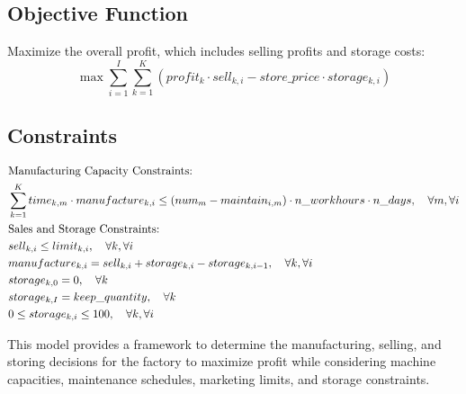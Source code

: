 \documentclass{article}
\begin{document}
\subsection*{Objective Function}
Maximize the overall profit, which includes selling profits and storage costs:
\[
\max \sum_{i=1}^{I} \sum_{k=1}^{K} \left( profit_{k} \cdot sell_{k,i} - store\_price \cdot storage_{k,i} \right)
\]

\subsection*{Constraints}
\begin{align}
    & \text{Manufacturing Capacity Constraints:} \notag \\
    & \sum_{k=1}^{K} time_{k,m} \cdot manufacture_{k,i} \leq \left( num_{m} - maintain_{i,m} \right) \cdot n\_workhours \cdot n\_days, \quad \forall m, \forall i \\
    & \text{Sales and Storage Constraints:} \notag \\
    & sell_{k,i} \leq limit_{k,i}, \quad \forall k, \forall i \\
    & manufacture_{k,i} = sell_{k,i} + storage_{k,i} - storage_{k,i-1}, \quad \forall k, \forall i \\
    & storage_{k,0} = 0, \quad \forall k \\
    & storage_{k,I} = keep\_quantity, \quad \forall k \\
    & 0 \leq storage_{k,i} \leq 100, \quad \forall k, \forall i \\
\end{align}

This model provides a framework to determine the manufacturing, selling, and storing decisions for the factory to maximize profit while considering machine capacities, maintenance schedules, marketing limits, and storage constraints.
\end{document}
